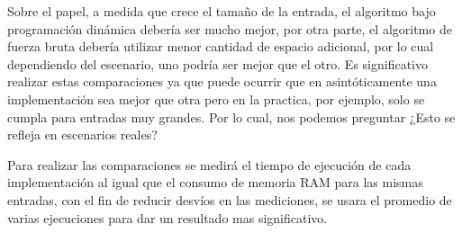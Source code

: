 Sobre el papel, a medida que crece el tamaño de la entrada, el algoritmo bajo programación
dinámica debería ser mucho mejor, por otra parte, el algoritmo de fuerza bruta debería
utilizar menor cantidad de espacio adicional, por lo cual dependiendo del escenario, uno
podría ser mejor que el otro. Es significativo 
realizar estas comparaciones ya que puede ocurrir 
que en asintóticamente una implementación sea mejor que otra
pero en la practica, por ejemplo, solo se cumpla para entradas muy grandes.
Por lo cual, nos podemos preguntar ¿Esto se refleja en escenarios reales?


Para realizar las comparaciones
se medirá el tiempo de ejecución de cada implementación
al igual que el consumo de memoria RAM para las mismas entradas, con 
el fin de reducir desvíos en las mediciones, se usara el promedio
de varias ejecuciones para dar un resultado mas significativo.
